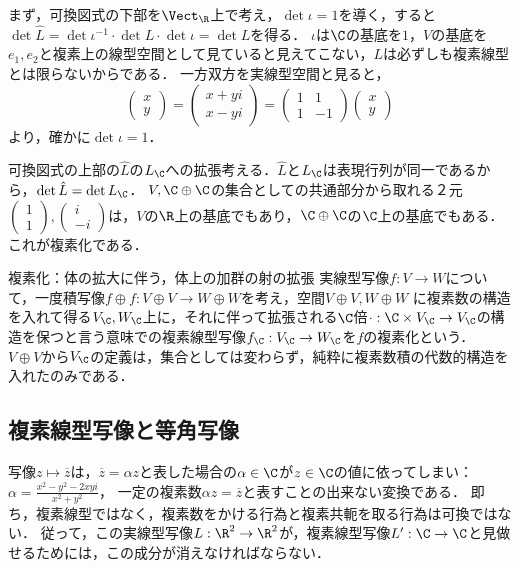 \documentclass[uplatex, dvipdfmx]{jsreport}
\begin{document}
\begin{remark}
    まず，可換図式の下部を$\Vect_\R$上で考え，$\det\iota=1$を導く，すると$\det\hat{L}=\det\iota^{-1}\cdot\det L\cdot\det\iota=\det L$を得る．
    $\iota$は$\C$の基底を$1$，$V$の基底を$e_1,e_2$と複素上の線型空間として見ていると見えてこない，$L$は必ずしも複素線型とは限らないからである．
    一方双方を実線型空間と見ると，
    \[ \begin{pmatrix}x\\y\end{pmatrix} = \begin{pmatrix}x+yi\\x-yi\end{pmatrix} = \begin{pmatrix}1&1\\1&-1\end{pmatrix} \begin{pmatrix}x\\y\end{pmatrix} \]
    より，確かに$\det\iota=1$．

    可換図式の上部の$\hat{L}$の$L_\C$への拡張考える．$\hat{L}$と$L_\C$は表現行列が同一であるから，$\det\hat{L}=\det L_\C$．
    $V,\C\oplus\C$の集合としての共通部分から取れる２元$\begin{pmatrix}1\\1\end{pmatrix},\begin{pmatrix}i\\-i\end{pmatrix}$は，$V$の$\R$上の基底でもあり，$\C\oplus\C$の$\C$上の基底でもある．
    これが複素化である．
\end{remark}

\begin{itembox}[l]{複素化：体の拡大に伴う，体上の加群の射の拡張}
    実線型写像$f:V\to W$について，一度積写像$f\oplus f:V\oplus V\to W\oplus W$を考え，空間$V\oplus V,W\oplus W$
    に複素数の構造を入れて得る$V_\C,W_\C$上に，それに伴って拡張される$\C$倍$\cdot:\C\times V_\C\to V_\C$の構造を保つと言う意味での複素線型写像$f_\C:V_\C\to W_\C$を$f$の複素化という．
    $V\oplus V$から$V_\C$の定義は，集合としては変わらず，純粋に複素数積の代数的構造を入れたのみである．
\end{itembox}

\subsection{複素線型写像と等角写像}

写像$z\mapsto\overline{z}$は，$\overline{z}=\alpha z$と表した場合の$\alpha\in\C$が$z\in\C$の値に依ってしまい：$\alpha=\frac{x^2-y^2-2xyi}{x^2+y^2}$，
一定の複素数$\alpha z=\overline{z}$と表すことの出来ない変換である．
即ち，複素線型ではなく，複素数をかける行為と複素共軛を取る行為は可換ではない．
従って，この実線型写像$L:\R^2\to\R^2$が，複素線型写像$L':\C\to\C$と見做せるためには，この成分が消えなければならない．
\end{document}
